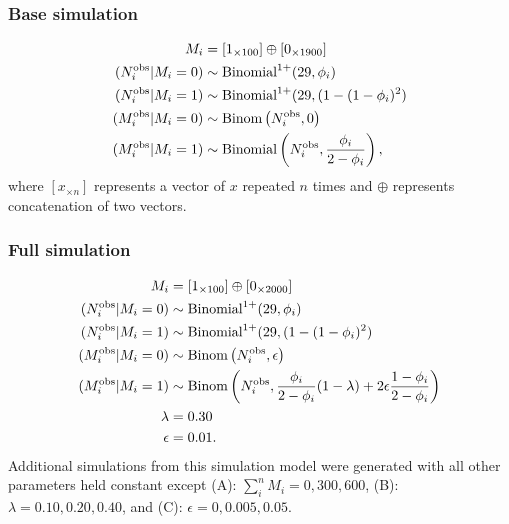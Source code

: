 \documentclass[10pt,letterpaper]{article}
\newcommand{\MI}{M^{\text{\text{obs}}}}
\begin{document}
\subsubsection{Base simulation}
\label{sec:base_simulation}
\begin{subequations}
\begin{align}
M_i &= [{1}_{\times 100}] \oplus [{0}_{\times 1900}]\\
(N^{\text{obs}}_i | M_i = 0) &\sim \text{Binomial}^{1+}(29, \phi_i) \\
(N^{\text{obs}}_i | M_i = 1) &\sim \text{Binomial}^{1+}(29, (1-(1-\phi_i)^2) \\
(\MI_i | M_i = 0)  &\sim \text{Binom}\left(N^{\text{obs}}_i, 0\right)\\
(\MI_i | M_i = 1) &\sim \text{Binomial}\left( N^{\text{obs}}_i, \frac{\phi_i}{2-\phi_i}\right),
\end{align}
\end{subequations}
where $[{x}_{\times n}]$ represents a vector of $x$ repeated $n$ times and $\oplus$ represents concatenation of two vectors. \par

\subsubsection{Full simulation}
\label{sec:full_simulation}
\begin{subequations}
\begin{align}
M_i &= [{1}_{\times 100}] \oplus [{0}_{\times 2000}]\\
(N^{\text{obs}}_i | M_i = 0) &\sim \text{Binomial}^{1+}(29, \phi_i) \\
(N^{\text{obs}}_i | M_i = 1) &\sim \text{Binomial}^{1+}(29, (1-(1-\phi_i)^2) \\
(\MI_i | M_i = 0)  &\sim \text{Binom}\left(N^{\text{obs}}_i, \epsilon\right)\\
(\MI_i | M_i = 1) &\sim \text{Binom}\left(N^{\text{obs}}_i, \frac{\phi_i}{2-\phi_i}(1-\lambda) + 2\epsilon\frac{1-\phi_i}{2-\phi_i}\right) \\
\lambda &= 0.30 \\
\epsilon &= 0.01.
\end{align}
\end{subequations}
Additional simulations from this simulation model were generated with all other parameters held constant except (A): $\sum_i^n M_i = 0, 300, 600$, (B): $\lambda = 0.10, 0.20, 0.40$, and (C): $\epsilon = 0, 0.005, 0.05$.
\end{document}
